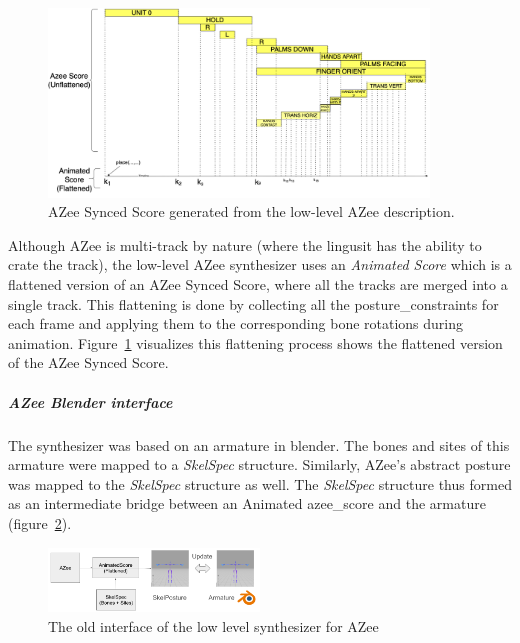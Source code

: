 \documentclass[../../main.tex]{subfiles}
\begin{document}
\begin{figure}[h]
  \centering
  \includegraphics[width=0.9\textwidth]{chapters/background_work/images/azee_score_armoire_combined.png}
  \caption{AZee Synced Score generated from the low-level AZee description.}
  \label{fig:azee_score_armoire_combined}
\end{figure}

Although AZee is multi-track by nature (where the lingusit has the ability to crate the track), the low-level AZee synthesizer uses an \emph{Animated Score} which is a flattened version of an AZee Synced Score, where all the tracks are merged into a single track. This flattening is done by collecting all the \gls{posture_constraint}s for each frame and applying them to the corresponding bone rotations during animation. Figure~\ref{fig:azee_score_armoire_combined} visualizes this flattening process shows the flattened version of the AZee Synced Score.

\subparagraph{AZee Blender interface}
\label{ch:background_work:sign_language_synthesis:3d_techniques:sign_language_synthesis_systems:azee_based:low_level_synthesizer_for_azee:azee_blender_interface}

The synthesizer was based on an armature in blender. The bones and sites of this armature were mapped to a \emph{SkelSpec} structure. Similarly, AZee's abstract posture was mapped to the \emph{SkelSpec} structure as well. The \emph{SkelSpec} structure thus formed as an intermediate bridge between an Animated \gls{azee_score} and the armature (figure~\ref{fig:old_interface}). 

\begin{figure}
    \centering
    \includegraphics[width=0.5\textwidth]{chapters/background_work/images/old_interface.png}
    \caption{The old interface of the low level synthesizer for AZee}
    \label{fig:old_interface}
\end{figure}
\end{document}

